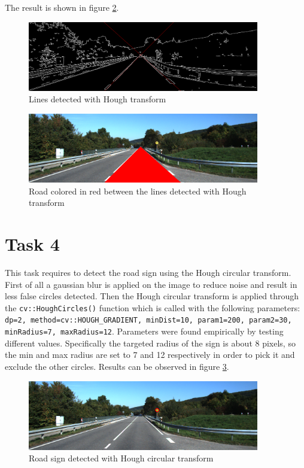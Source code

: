 \documentclass{article}
\begin{document}
The result is shown in figure \ref{fig:road_red_Hough}.

\begin{figure}[h]
	\centering
	\includegraphics[width=0.9\textwidth]{street_scene_Hough2Lines.png}
	\caption{Lines detected with Hough transform}
	\label{fig:2lines_Hough}
\end{figure}

\begin{figure}[H]
	\centering
	\includegraphics[width=0.9\textwidth]{street_scene_HoughRoadRed.png}
	\caption{Road colored in red between the lines detected with Hough transform}
	\label{fig:road_red_Hough}
\end{figure}


\section*{Task 4}
This task requires to detect the road sign using the Hough circular transform.
First of all a gaussian blur is applied on the image to reduce noise and result in less false circles detected.
Then the Hough circular transform is applied through the \texttt{cv::HoughCircles()} function which is called with the following parameters: \texttt{dp=2, method=cv::HOUGH\_GRADIENT, minDist=10, param1=200, param2=30, minRadius=7, maxRadius=12}.
Parameters were found empirically by testing different values. Specifically the targeted radius of the sign is about 8 pixels, so the min and max radius are set to 7 and 12 respectively in order to pick it and exclude the other circles.
Results can be observed in figure \ref{fig:sign_Hough}.

\begin{figure}[H]
	\centering
	\includegraphics[width=0.9\textwidth]{street_scene_HoughSign.png}
	\caption{Road sign detected with Hough circular transform}
	\label{fig:sign_Hough}
\end{figure}
\end{document}
